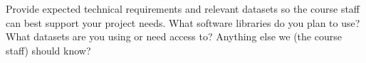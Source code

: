 \documentclass{article} %
\begin{document}
Provide expected technical requirements and relevant datasets so the course staff can best support your project needs. What software libraries do you plan to use? What datasets are you using or need access to? Anything else we (the course staff) should know?

\nocite{Bengio+chapter2007}
\nocite{Hinton06}



\end{document}
